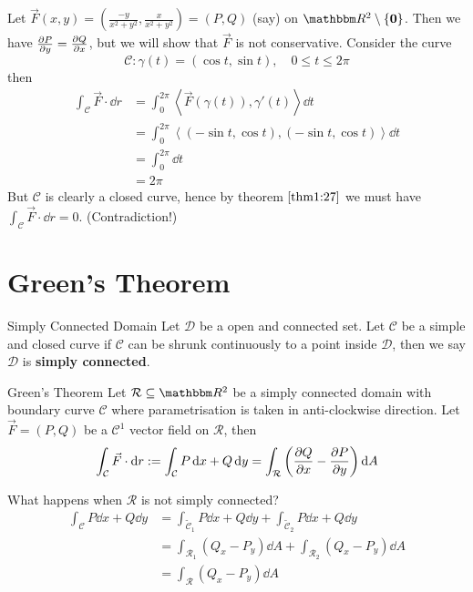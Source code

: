 \documentclass[Analysis-3]{subfiles}
\begin{document}
\begin{Eg}{}{}
    Let $\vec{F}(x,y) = \left( \frac{-y}{x^2+y^2}, \frac{x}{x^2+y^2} \right) = (P,Q)$ (say) on $\R^2 \setminus \{\mathbf{0}\}$. Then we have $\pdv{P}{y} = \pdv{Q}{x}$, but we will show that $\vec{F}$ is not conservative. Consider the curve 
    \[
        \mathcal{C} : \gamma(t) = ( \cos t, \sin t), \quad 0 \leq t \leq 2\pi    
    \]
    then 
    \begin{align*}
        \int_{\mathcal{C}} \vec{F} \cdot \dd r &= \int_0^{2\pi} \left\langle \vec{F}(\gamma(t)),\gamma'(t) \right\rangle \dd t \\ 
        &= \int_0^{2\pi} \left\langle (-\sin t, \cos t), (-\sin t, \cos t) \right\rangle \dd t \\ 
        &= \int_0^{2\pi} \dd t \\ 
        &= 2\pi
    \end{align*}
    But $\mathcal{C}$ is clearly a closed curve, hence by theorem $\ref{thm1:27}$ we must have $\int_{\mathcal{C}} \vec{F} \cdot \dd r = 0$. (Contradiction!)
\end{Eg}

\section{Green's Theorem}

\begin{Def}{Simply Connected Domain}{}
    Let $\mathcal{D}$ be a open and connected set. Let $\mathcal{C}$ be a simple and closed curve if $\mathcal{C}$ can be shrunk continuously to a point inside $\mathcal{D}$, then we say $\mathcal{D}$ is \textbf{simply connected}.
\end{Def}

\begin{Thm}{Green's Theorem}{}\label{thm2:27}
    Let $\mathcal{R} \subseteq \R^2 $ be a simply connected domain with boundary curve $\mathcal{C}$ where parametrisation is taken in anti-clockwise direction. Let $\vec{F} = (P,Q)$ be a $\mathscr{C}^1$ vector field on $\mathcal{R}$, then 
\[
    \int_{\mathcal{C}} \vec{F} \cdot \dd r := \int_{\mathcal{C}} P \, \dd x + Q \, \dd y = \int_{\mathcal{R}} \left( \pdv{Q}{x} - \pdv{P}{y}\right) \dd A 
\]
\end{Thm}

What happens when $\mathcal{R}$ is not simply connected? 
\begin{align*}
    \int_{\mathcal{C}} P \dd x + Q \dd y &= \int_{\tilde{\mathcal{C}}_1} P \dd x + Q \dd y + \int_{\tilde{\mathcal{C}}_2} P \dd x + Q \dd y \\ 
    &= \int_{\mathcal{R}_1} (Q_x - P_y) \dd A + \int_{\mathcal{R}_2} (Q_x - P_y) \dd A \\ 
    &= \int_{\mathcal{R}} (Q_x - P_y) \dd A
\end{align*}
\end{document}
